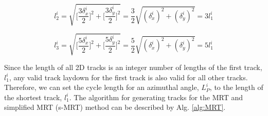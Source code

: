 \begin{equation}
l_2^i = \sqrt{\bigg[\frac{3 \delta_x^i}{2}\bigg]^2 + \bigg[\frac{3 \delta_y^i}{2}\bigg]^2} = \frac{3}{2} \sqrt{(\delta_x^i)^2 + (\delta_y^i)^2} = 3 l_1^i
\label{eqn:short-track-2}
\end{equation}

\begin{equation}
l_3^i = \sqrt{\bigg[\frac{5 \delta_x^i}{2}\bigg]^2 + \bigg[\frac{5 \delta_y^i}{2}\bigg]^2} = \frac{5}{2} \sqrt{(\delta_x^i)^2 + (\delta_y^i)^2} = 5 l_1^i
\label{eqn:short-track-3}
\end{equation}

Since the length of all 2D tracks is an integer number of lengths of the first track, $l_1^i$, any valid track laydown for the first track is also valid for all other tracks. Therefore, we can set the cycle length for an azimuthal angle, $L_P^i$, to the length of the shortest track, $l_1^i$. The algorithm for generating tracks for the MRT and simplified MRT (s-MRT) method can be described by Alg. \ref{alg:MRT}. 

